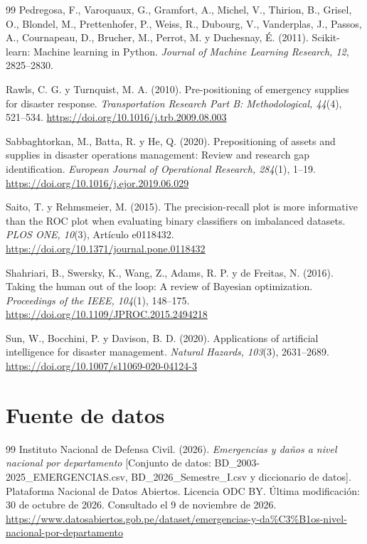 \documentclass[12pt,a4paper]{article}
\begin{document}
\begin{thebibliography}{99}
Pedregosa, F., Varoquaux, G., Gramfort, A., Michel, V., Thirion, B., Grisel, O., Blondel, M., Prettenhofer, P.,
Weiss, R., Dubourg, V., Vanderplas, J., Passos, A., Cournapeau, D., Brucher, M., Perrot, M. y Duchesnay, É.
(2011). Scikit-learn: Machine learning in Python. \emph{Journal of Machine Learning Research, 12}, 2825--2830.

Rawls, C. G. y Turnquist, M. A. (2010). Pre-positioning of emergency supplies for disaster response.
\emph{Transportation Research Part B: Methodological, 44}(4), 521--534. \url{https://doi.org/10.1016/j.trb.2009.08.003}

Sabbaghtorkan, M., Batta, R. y He, Q. (2020). Prepositioning of assets and supplies in disaster operations
management: Review and research gap identification. \emph{European Journal of Operational Research, 284}(1), 1--19.
\url{https://doi.org/10.1016/j.ejor.2019.06.029}

Saito, T. y Rehmsmeier, M. (2015). The precision-recall plot is more informative than the ROC plot when evaluating
binary classifiers on imbalanced datasets. \emph{PLOS ONE, 10}(3), Artículo e0118432.
\url{https://doi.org/10.1371/journal.pone.0118432}

Shahriari, B., Swersky, K., Wang, Z., Adams, R. P. y de Freitas, N. (2016). Taking the human out of the loop: A
review of Bayesian optimization. \emph{Proceedings of the IEEE, 104}(1), 148--175.
\url{https://doi.org/10.1109/JPROC.2015.2494218}

Sun, W., Bocchini, P. y Davison, B. D. (2020). Applications of artificial intelligence for disaster management.
\emph{Natural Hazards, 103}(3), 2631--2689. \url{https://doi.org/10.1007/s11069-020-04124-3}
\end{thebibliography}

\section*{Fuente de datos}
\renewcommand{\refname}{}
\vspace{-1.2cm}
\begin{thebibliography}{99}\small
{}
Instituto Nacional de Defensa Civil. (2026). \emph{Emergencias y daños a nivel nacional por departamento}
[Conjunto de datos: BD\_2003-2025\_EMERGENCIAS.csv, BD\_2026\_Semestre\_I.csv y diccionario de datos]. Plataforma
Nacional de Datos Abiertos. Licencia ODC BY. Última modificación: 30 de octubre de 2026. Consultado el 9 de
noviembre de 2026. \url{https://www.datosabiertos.gob.pe/dataset/emergencias-y-da\%C3\%B1os-nivel-nacional-por-departamento}
\end{thebibliography}
\end{document}
